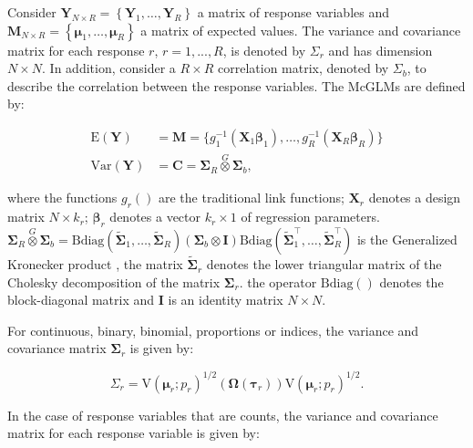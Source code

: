 \documentclass[article]{jss}\usepackage[]{graphicx}\usepackage[]{xcolor}
\begin{document}
Consider $\boldsymbol{Y}_{N \times R} = \left \{ \boldsymbol{Y}_1, \dots, \boldsymbol{Y}_R \right \}$ a matrix of response variables and $\boldsymbol{M}_{N \times R} = \left \{ \boldsymbol{\mu}_1, \dots, \boldsymbol{\mu}_R \right \}$ a matrix of expected values. The variance and covariance matrix for each response $r$, $r = 1,..., R$, is denoted by $\Sigma_r$ and has dimension $N \times N$. In addition, consider a $R \times R$ correlation matrix, denoted by $\Sigma_b$, to describe the correlation between the response variables. The McGLMs \citep{Bonat16} are defined by:

$$
      \begin{aligned}
        \mathrm{E}(\boldsymbol{Y}) &=
          \boldsymbol{M} =
            \{g_1^{-1}(\boldsymbol{X}_1 \boldsymbol{\beta}_1),
            \ldots,
            g_R^{-1}(\boldsymbol{X}_R \boldsymbol{\beta}_R)\}
          \\
        \mathrm{Var}(\boldsymbol{Y}) &=
          \boldsymbol{C} =
            \boldsymbol{\Sigma}_R \overset{G} \otimes
            \boldsymbol{\Sigma}_b,
      \end{aligned}
$$

\noindent where the functions $g_r()$ are the traditional link functions; $\boldsymbol{X}_r$ denotes a design matrix $N \times k_r$; $\boldsymbol{\beta}_r$ denotes a vector $k_r \times 1$ of regression parameters. $\boldsymbol{\Sigma}_R \overset{G} \otimes \boldsymbol{\Sigma}_b = \mathrm{Bdiag}(\tilde{\boldsymbol{\Sigma}}_1, \ldots, \tilde{\boldsymbol{\Sigma}}_R) (\boldsymbol{\Sigma}_b \otimes \boldsymbol{I}) \mathrm{Bdiag}(\tilde{\boldsymbol{\Sigma}}_1^\top, \ldots, \tilde{\boldsymbol{\Sigma}}_R^\top)$ is the Generalized Kronecker product \citep{martinez13}, the matrix $\tilde{\boldsymbol{\Sigma}}_r$ denotes the lower triangular matrix of the Cholesky decomposition of the matrix ${\boldsymbol{\Sigma}}_r$. the operator $\mathrm{Bdiag()}$ denotes the block-diagonal matrix and $\boldsymbol{I}$ is an identity matrix $N \times N$. 

For continuous, binary, binomial, proportions or indices, the variance and covariance matrix $\boldsymbol{\Sigma}_r$ is given by:

$$
\Sigma_r =
\mathrm{V}\left(\boldsymbol{\mu}_r; p_r\right)^{1/2}(\boldsymbol{\Omega}\left(\boldsymbol{\tau}_r\right))\mathrm{V}\left(\boldsymbol{\mu}_r; p_r\right)^{1/2}.
$$

In the case of response variables that are counts, the variance and covariance matrix for each response variable is given by:
\end{document}
